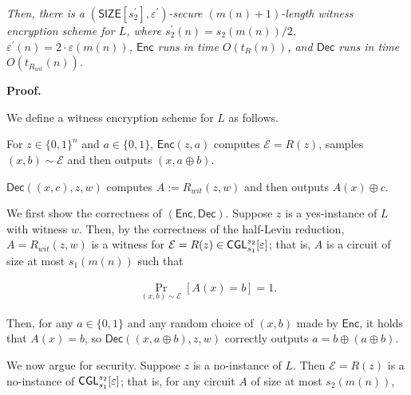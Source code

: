 \emph{Then, there is a $({\mathsf{SIZE}}[s_{2}^{\prime}],\varepsilon^{\prime})$-secure $(m(n)+1)$-length witness encryption scheme for $L$, where $s_{2}^{\prime}(n)=s_{2}(m(n))/2$, $\varepsilon^{\prime}(n)=2\cdot\varepsilon(m(n))$, ${\mathsf{Enc}}$ runs in time $O(t_{R}(n))$, and ${\mathsf{Dec}}$ runs in time $O(t_{R_{wit}}(n))$.}\par







\par\medskip\noindent\textbf{Proof.}\par




We define a witness encryption scheme for $L$ as follows.\par



For $z\in\{0,1\}^{n}$ and $a\in\{0,1\}$, ${\mathsf{Enc}}(z,a)$ computes $\mathcal{E}=R(z)$, samples $(x,b)\sim\mathcal{E}$ and then outputs $(x,a\oplus b)$.\par




${\mathsf{Dec}}((x,c),z,w)$ computes $A:=R_{wit}(z,w)$ and then outputs $A(x)\oplus c$.\par





We first show the correctness of $({\mathsf{Enc}},{\mathsf{Dec}})$. Suppose $z$ is a yes-instance of $L$ with witness $w$. Then, by the correctness of the half-Levin reduction, $A=R_{wit}(z,w)$ is a witness for $\mathcal{E}=R(z)\in{\sf CGL}_{s_{1}}^{s_{2}}[\varepsilon]$; that is, $A$ is a circuit of size at most $s_{1}(m(n))$ such that\par


\[\begin{gathered}
\Pr_{(x,b)\sim\mathcal{E}}[A(x)=b]=1.
\end{gathered}\]


Then, for any $a\in\{0,1\}$ and any random choice of $(x,b)$ made by ${\mathsf{Enc}}$, it holds that $A(x)=b$, so ${\mathsf{Dec}}((x,a\oplus b),z,w)$ correctly outputs $a=b\oplus(a\oplus b)$.\par




We now argue for security. Suppose $z$ is a no-instance of $L$. Then $\mathcal{E}=R(z)$ is a no-instance of ${\sf CGL}_{s_{1}}^{s_{2}}[\varepsilon]$; that is, for any circuit $A$ of size at most $s_{2}(m(n))$,\par


